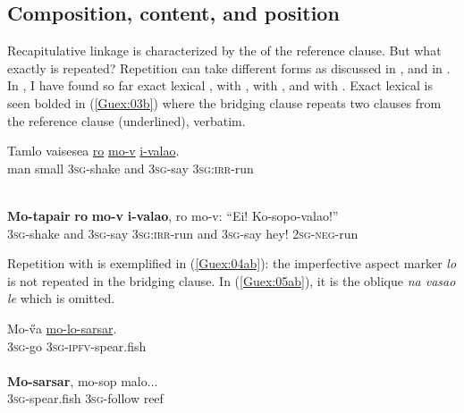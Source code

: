 \documentclass[output=paper]{LSP/langsci}
\begin{document}
\subsection{Composition, content, and position} 
\label{Gusec:Composition}
Recapitulative linkage is characterized by the  of the reference clause. But what exactly is repeated? Repetition can take different forms as discussed in , and in \citet[][224]{brown.2000}. In , I have found so far exact lexical ,  with , with , and  with .  Exact lexical  is seen bolded in (\ref{Guex:03b}) where the bridging clause repeats two clauses from the reference clause (underlined), verbatim. 

\begin{exe}
\ex \label{Guex:03ab}
\begin{xlist}
\ex \label{Guex:03a}
\gll Tamlo   vaisesea   \underline{}   \underline{ro}    \underline{mo-v}       \underline{i-valao}.\\
man     small      \textsc{3sg}-shake    and   \textsc{3sg}-say   \textsc{3sg}:\textsc{irr}-run\\
\glt {}\\

\pagebreak

\ex \label{Guex:03b}
\gll \textbf{Mo-tapair}   \textbf{ro}     \textbf{mo-v}       \textbf{i-valao}, ro mo-v:     {``Ei!  Ko-sopo-valao!''}\\     	       
    \textsc{3sg}-shake    and   \textsc{3sg}-say   \textsc{3sg:irr}-run    and \textsc{3sg}-say   {hey!  \textsc{2sg-neg}-run}\\
\glt {} 
\end{xlist}
\end{exe}

Repetition with  is exemplified in (\ref{Guex:04ab}): the imperfective aspect marker \textit{lo} is not repeated in the bridging clause. In (\ref{Guex:05ab}), it is the oblique \textit{na vasao le} which is omitted.

\begin{exe}
\ex \label{Guex:04ab}
\begin{xlist}
\ex \label{Guex:04a}
\gll Mo-\H{v}a \underline{mo-lo-sarsar}.\\
\textsc{3sg}-go     \textsc{3sg}-\textsc{ipfv}-spear.fish\\
\glt {}\\
\ex \label{Guex:04b}
\gll \textbf{Mo-sarsar},   mo-sop         malo...\\     	       
    \textsc{3sg}-spear.fish    \textsc{3sg}-follow   reef \\
\glt {} 
\end{xlist}
\end{exe}
\end{document}
